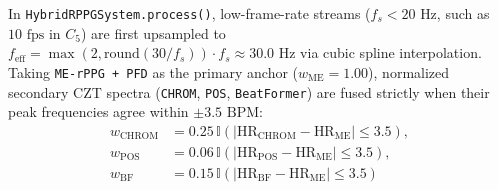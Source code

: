 \documentclass[conference]{IEEEtran}
\begin{document}
In \texttt{HybridRPPGSystem.process()}, low-frame-rate streams ($f_s < 20\text{ Hz}$, such as $10\text{ fps}$ in $C_5$) are first upsampled to $f_{\text{eff}} = \max(2, \text{round}(30/f_s))\cdot f_s \approx 30.0\text{ Hz}$ via cubic spline interpolation. Taking \texttt{ME-rPPG + PFD} as the primary anchor ($w_{\text{ME}} = 1.00$), normalized secondary CZT spectra (\texttt{CHROM}, \texttt{POS}, \texttt{BeatFormer}) are fused strictly when their peak frequencies agree within $\pm 3.5\text{ BPM}$:
\begin{align}
w_{\text{CHROM}} &= 0.25\,\mathbb{I}\!\left(\lvert\text{HR}_{\text{CHROM}} - \text{HR}_{\text{ME}}\rvert \le 3.5\right), \nonumber\\
w_{\text{POS}} &= 0.06\,\mathbb{I}\!\left(\lvert\text{HR}_{\text{POS}} - \text{HR}_{\text{ME}}\rvert \le 3.5\right), \label{eq:consensus_weights}\\
w_{\text{BF}} &= 0.15\,\mathbb{I}\!\left(\lvert\text{HR}_{\text{BF}} - \text{HR}_{\text{ME}}\rvert \le 3.5\right) \nonumber
\end{align}
\end{document}
